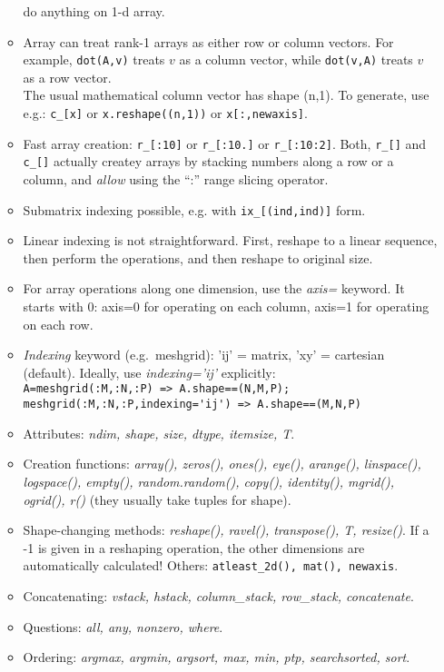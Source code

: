 \documentclass[10pt]{article}
\begin{document}
\begin{enumerate}
\begin{itemize}
    do anything on 1-d array.
  \item Array can treat rank-1 arrays as either row or column
    vectors. For example, \verb|dot(A,v)| treats $v$ as a column
    vector,
    while \verb|dot(v,A)| treats $v$ as a row vector.\\
    The usual mathematical column vector has shape (n,1). To generate,
    use e.g.: \verb|c_[x]| or \verb|x.reshape((n,1))| or \verb|x[:,newaxis]|.
  \item Fast array creation: \verb|r_[:10]| or \verb|r_[:10.]| or
    \verb|r_[:10:2]|. Both, \verb|r_[]| and \verb|c_[]| actually
    createy arrays by stacking numbers along a row or a column, and
    \emph{allow} using the ``:'' range slicing operator.
  \item Submatrix indexing possible, e.g. with \verb|ix_[(ind,ind)]| form.
  \item Linear indexing is not straightforward. First, reshape to a
    linear sequence, then perform the operations, and then reshape to
    original size.
  \item For array operations along one dimension, use the \emph{axis=}
    keyword. It starts with 0: axis=0 for operating on each column,
    axis=1 for operating on each row.
  \item \emph{Indexing} keyword (e.g.\ meshgrid): 'ij' = matrix, 'xy'
    = cartesian (default). Ideally, use \emph{indexing='ij'}
    explicitly:\\
    \verb|A=meshgrid(:M,:N,:P) => A.shape==(N,M,P); meshgrid(:M,:N,:P,indexing='ij') => A.shape==(M,N,P)|
  \item Attributes: \emph{ndim, shape, size, dtype,
      itemsize, T}.
  \item Creation functions: \emph{array(), zeros(), ones(),
      eye(), arange(), linspace(), logspace(), empty(),
      random.random(), copy(), identity(), mgrid(), ogrid(), r()}
    (they usually take tuples for shape).
  \item Shape-changing methods: \emph{reshape(), ravel(), transpose(),
      T, resize()}. If a -1 is given in a reshaping operation, the
    other dimensions are automatically calculated! Others:
    \verb|atleast_2d(), mat(), newaxis|.
  \item Concatenating: \emph{vstack, hstack, column\_stack, row\_stack,
      concatenate}.
  \item Questions: \emph{all, any, nonzero, where}.
  \item Ordering: \emph{argmax, argmin, argsort, max, min, ptp,
      searchsorted, sort}.

\end{itemize}
\end{enumerate}
\end{document}
